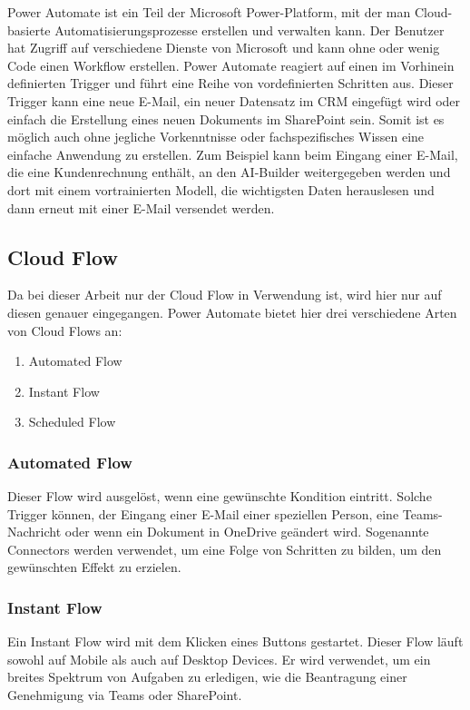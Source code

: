 Power Automate ist ein Teil der Microsoft Power-Platform, mit der man Cloud-basierte Automatisierungsprozesse erstellen und verwalten kann. Der Benutzer hat Zugriff auf verschiedene Dienste von Microsoft und kann ohne oder wenig Code einen Workflow erstellen. Power Automate reagiert auf einen im Vorhinein definierten Trigger und führt eine Reihe von vordefinierten Schritten aus. Dieser Trigger kann eine neue E-Mail, ein neuer Datensatz im CRM eingefügt wird oder einfach die Erstellung eines neuen Dokuments im SharePoint sein. Somit ist es möglich auch ohne jegliche Vorkenntnisse oder fachspezifisches Wissen eine einfache Anwendung zu erstellen. Zum Beispiel kann beim Eingang einer E-Mail, die eine Kundenrechnung enthält, an den AI-Builder weitergegeben werden und dort mit einem vortrainierten Modell, die wichtigsten Daten herauslesen und dann erneut mit einer E-Mail versendet werden.

\subsection{Cloud Flow}
Da bei dieser Arbeit nur der Cloud Flow in Verwendung ist, wird hier nur auf diesen genauer eingegangen. Power Automate bietet hier drei verschiedene Arten von Cloud Flows an:

\begin{enumerate}
    \item Automated Flow
    \item Instant Flow
    \item Scheduled Flow
\end{enumerate}

\subsubsection{Automated Flow}
Dieser Flow wird ausgelöst, wenn eine gewünschte Kondition eintritt. Solche Trigger können, der Eingang einer E-Mail einer speziellen Person, eine Teams-Nachricht oder wenn ein Dokument in OneDrive geändert wird. Sogenannte Connectors werden verwendet, um eine Folge von Schritten zu bilden, um den gewünschten Effekt zu erzielen.

\subsubsection{Instant Flow}
Ein Instant Flow wird mit dem Klicken eines Buttons gestartet. Dieser Flow läuft sowohl auf Mobile als auch auf Desktop Devices. Er wird verwendet, um ein breites Spektrum von Aufgaben zu erledigen, wie die Beantragung einer Genehmigung via Teams oder SharePoint.

